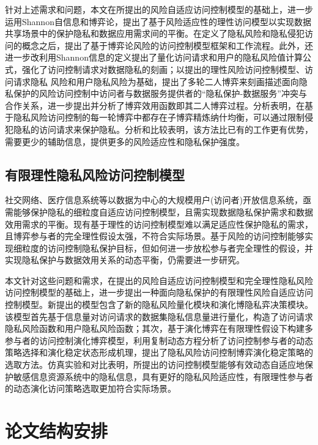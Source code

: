 针对上述需求和问题，本文在所提出的风险自适应访问控制模型的基础上，进一步运用Shannon自信息和博弈论，提出了基于风险适应性的理性访问模型以实现数据共享场景中的保护隐私和数据应用需求间的平衡。在定义了隐私风险和隐私侵犯访问的概念之后，提出了基于博弈论风险的访问控制模型框架和工作流程。此外，还进一步改利用Shannon信息的定义提出了量化访问请求和用户的隐私风险值计算公式，强化了访问控制请求对数据隐私的刻画；以提出的理性风险访问控制模型、访问请求隐私 风险和用户隐私风险为基础，提出了多轮二人博弈来刻画描述面向隐私保护的风险访问控制中访问者与数据服务提供者的“隐私保护-数据服务”冲突与合作关系，进一步提出并分析了博弈效用函数即其二人博弈过程。分析表明，在基于隐私风险访问控制的每一轮博弈中都存在子博弈精炼纳什均衡，可以通过限制侵犯隐私的访问请求来保护隐私。分析和比较表明，该方法比已有的工作更有优势，需要更少的辅助信息，提供更多的风险适应性和隐私保护强度。

\subsection{有限理性隐私风险访问控制模型}

社交网络、医疗信息系统等以数据为中心的大规模用户(访问者)开放信息系统，亟需能够保护隐私的细粒度自适应访问控制模型，且需实现数据隐私保护需求和数据效用需求的平衡。现有基于理性的访问控制模型难以满足适应性保护隐私的需求，且博弈参与者的完全理性假设太强，不符合实际场景。基于风险的访问控制能够实现细粒度的访问控制隐私保护目标，但如何进一步放松参与者完全理性的假设，并实现隐私保护与数据效用关系的动态平衡，仍需要进一步研究。

本文针对这些问题和需求，在提出的风险自适应访问控制模型和完全理性隐私风险访问控制模型的基础上，进一步提出一种面向隐私保护的有限理性风险自适应访问控制模型。新提出的模型包含了新的隐私风险量化模块和演化博隐私弈决策模块。该模型首先基于信息量对访问请求的数据集隐私信息量进行量化，构造了访问请求隐私风险函数和用户隐私风险函数；其次，基于演化博弈在有限理性假设下构建多参与者的访问控制演化博弈模型，利用复制动态方程分析了访问控制参与者的动态策略选择和演化稳定状态形成机理，提出了隐私风险访问控制博弈演化稳定策略的选取方法。仿真实验和对比表明，所提出的访问控制模型能够有效动态自适应地保护敏感信息资源系统中的隐私信息，具有更好的隐私风险适应性，有限理性参与者的动态演化访问策略选取更加符合实际场景。

\section{论文结构安排}

